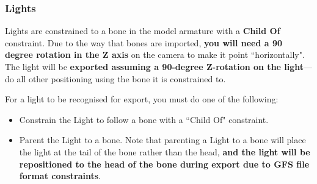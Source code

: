 \documentclass{article}
\begin{document}
\subsubsection{Lights}
Lights are constrained to a bone in the model armature with a \textbf{Child Of} constraint. Due to the way that bones are imported, \textbf{you will need a 90 degree rotation in the Z axis} on the camera to make it point ``horizontally". The light will be \textbf{exported assuming a 90-degree Z-rotation on the light}---do all other positioning using the bone it is constrained to.

For a light to be recognised for export, you must do one of the following:
\begin{itemize}
\item Constrain the Light to follow a bone with a ``Child Of" constraint.
\item Parent the Light to a bone. Note that parenting a Light to a bone will place the light at the tail of the bone rather than the head, \textbf{and the light will be repositioned to the head of the bone during export due to GFS file format constraints}.
\end{itemize}
\end{document}
